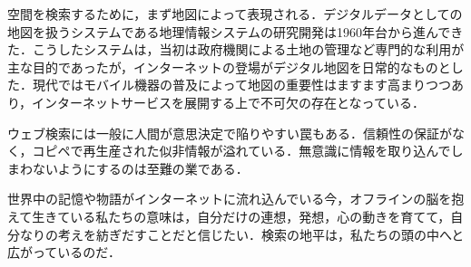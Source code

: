 \documentclass[uplatex,twocolumn,dvipdfmx]{jsarticle}
\begin{document}
空間を検索するために，まず地図によって表現される．デジタルデータとしての地図を扱うシステムである地理情報システムの研究開発は1960年台から進んできた．こうしたシステムは，当初は政府機関による土地の管理など専門的な利用が主な目的であったが，インターネットの登場がデジタル地図を日常的なものとした．現代ではモバイル機器の普及によって地図の重要性はますます高まりつつあり，インターネットサービスを展開する上で不可欠の存在となっている．

ウェブ検索には一般に人間が意思決定で陥りやすい罠もある．信頼性の保証がなく，コピペで再生産された似非情報が溢れている．無意識に情報を取り込んでしまわないようにするのは至難の業である．

世界中の記憶や物語がインターネットに流れ込んでいる今，オフラインの脳を抱えて生きている私たちの意味は，自分だけの連想，発想，心の動きを育てて，自分なりの考えを紡ぎだすことだと信じたい．検索の地平は，私たちの頭の中へと広がっているのだ．\nocite{takano2015}



\end{document}
